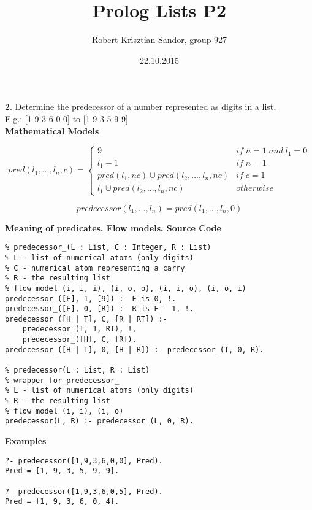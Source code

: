 \documentclass[11pt]{article}
\title{\textbf{Prolog Lists P2}}
\author{Robert Krisztian Sandor, group 927}
\date{22.10.2015}
\begin{document}
\maketitle

\textbf{2}. Determine the predecessor of a number represented as digits in a list. \\
E.g.: [1 9 3 6 0 0] to [1 9 3 5 9 9] \\

\textbf{Mathematical Models}

\[
pred(l_1, ..., l_n, c) = 
\left \{
	\begin{array}{ll}
		9 & if \; n = 1 \; and \; l_1 = 0 \\
		l_1 - 1 & if \; n = 1 \\
		pred(l_1, nc) \cup pred(l_2, ..., l_n, nc) & if \; c = 1 \\
		l_1 \cup pred(l_2, ..., l_n, nc) & otherwise
	\end{array}
\right.
\]

\[
predecessor(l_1, ..., l_n) = pred(l_1, ..., l_n, 0)
\]

\textbf{Meaning of predicates. Flow models. Source Code}

\begin{verbatim}
% predecessor_(L : List, C : Integer, R : List)
% L - list of numerical atoms (only digits)
% C - numerical atom representing a carry
% R - the resulting list
% flow model (i, i, i), (i, o, o), (i, i, o), (i, o, i)
predecessor_([E], 1, [9]) :- E is 0, !.
predecessor_([E], 0, [R]) :- R is E - 1, !.
predecessor_([H | T], C, [R | RT]) :-
    predecessor_(T, 1, RT), !,
    predecessor_([H], C, [R]).
predecessor_([H | T], 0, [H | R]) :- predecessor_(T, 0, R).

% predecessor(L : List, R : List)
% wrapper for predecessor_
% L - list of numerical atoms (only digits)
% R - the resulting list
% flow model (i, i), (i, o)
predecessor(L, R) :- predecessor_(L, 0, R).
\end{verbatim}

\textbf{Examples}
\begin{verbatim}
?- predecessor([1,9,3,6,0,0], Pred).
Pred = [1, 9, 3, 5, 9, 9].

?- predecessor([1,9,3,6,0,5], Pred).
Pred = [1, 9, 3, 6, 0, 4].

\end{verbatim}
\end{document}
